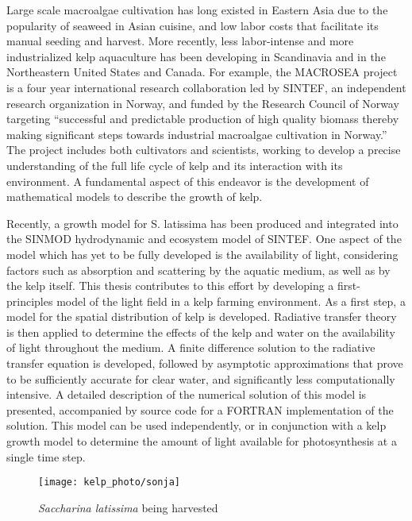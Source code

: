 Large scale macroalgae cultivation has long existed in Eastern Asia due to the popularity of seaweed in Asian cuisine, and low labor costs that facilitate its manual seeding and harvest.
  More recently, less labor-intense and more industrialized kelp aquaculture has been developing in Scandinavia and in the Northeastern United States and Canada.
For example, the MACROSEA project is a four year international research collaboration led by SINTEF, an independent research organization in Norway, and funded by the Research Council of Norway targeting ``successful and predictable production of high quality biomass thereby making significant steps towards industrial macroalgae cultivation in Norway.'' %
The project includes both cultivators and scientists, working to develop a precise understanding of the full life cycle of kelp and its interaction with its environment.
A fundamental aspect of this endeavor is the development of mathematical models to describe the growth of kelp.

Recently, a growth model\cite{broch_modelling_2012} for S. latissima has been produced and integrated into the SINMOD\cite{wassmann_modelling_2006} hydrodynamic and ecosystem model of SINTEF.
One aspect of the model which has yet to be fully developed is the availability of light, considering factors such as absorption and scattering by the aquatic medium, as well as by the kelp itself.
This thesis contributes to this effort by developing a first-principles model of the light field in a kelp farming environment.
As a first step, a model for the spatial distribution of kelp is developed.
Radiative transfer theory is then applied to determine the effects of the kelp and water on the availability of light throughout the medium.
A finite difference solution to the radiative transfer equation is developed, followed by asymptotic approximations that prove to be sufficiently accurate for clear water, and significantly less computationally intensive.
A detailed description of the numerical solution of this model is presented, accompanied by source code for a FORTRAN implementation of the solution.
This model can be used independently, or in conjunction with a kelp growth model to determine the amount of light available for photosynthesis at a single time step.

\begin{figure}[h]
  \centering
  \texttt{[image: kelp\_photo/sonja]}
  \caption{\textit{Saccharina latissima} being harvested}
\end{figure}


